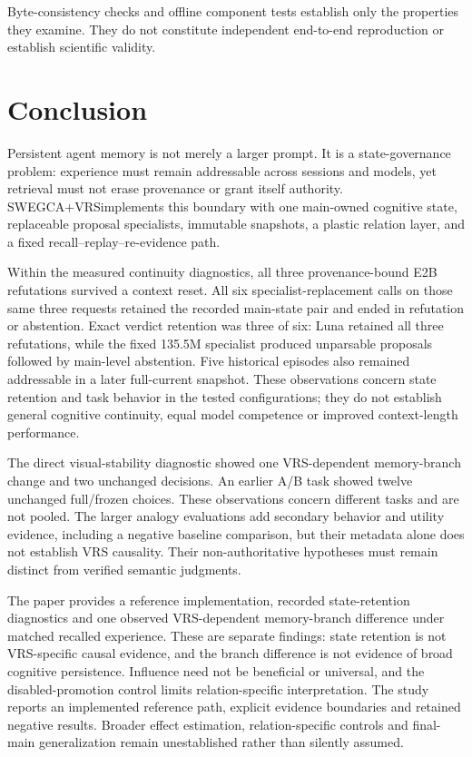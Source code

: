 \documentclass[11pt]{article}
\newcommand{\swegca}{SWEGCA}
\newcommand{\vrs}{VRS}
\begin{document}
Byte-consistency checks and offline component tests establish only the properties they examine. They do not constitute independent end-to-end reproduction or establish scientific validity.

\section{Conclusion}

Persistent agent memory is not merely a larger prompt.  It is a state-governance problem: experience must remain addressable across sessions and models, yet retrieval must not erase provenance or grant itself authority.  \swegca{}+\vrs implements this boundary with one main-owned cognitive state, replaceable proposal specialists, immutable snapshots, a plastic relation layer, and a fixed recall--replay--re-evidence path.

Within the measured continuity diagnostics, all three provenance-bound E2B refutations survived a context reset. All six specialist-replacement calls on those same three requests retained the recorded main-state pair and ended in refutation or abstention. Exact verdict retention was three of six: Luna retained all three refutations, while the fixed 135.5M specialist produced unparsable proposals followed by main-level abstention. Five historical episodes also remained addressable in a later full-current snapshot. These observations concern state retention and task behavior in the tested configurations; they do not establish general cognitive continuity, equal model competence or improved context-length performance.

The direct visual-stability diagnostic showed one VRS-dependent memory-branch change and two unchanged decisions. An earlier A/B task showed twelve unchanged full/frozen choices. These observations concern different tasks and are not pooled. The larger analogy evaluations add secondary behavior and utility evidence, including a negative baseline comparison, but their metadata alone does not establish VRS causality. Their non-authoritative hypotheses must remain distinct from verified semantic judgments.

The paper provides a reference implementation, recorded state-retention diagnostics and one observed VRS-dependent memory-branch difference under matched recalled experience. These are separate findings: state retention is not VRS-specific causal evidence, and the branch difference is not evidence of broad cognitive persistence. Influence need not be beneficial or universal, and the disabled-promotion control limits relation-specific interpretation. The study reports an implemented reference path, explicit evidence boundaries and retained negative results. Broader effect estimation, relation-specific controls and final-main generalization remain unestablished rather than silently assumed.



\end{document}
